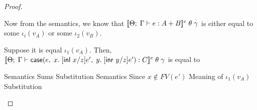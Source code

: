 \begin{proof}
\begin{itemize}
\begin{eqnproof}
  \end{eqnproof}

Now from the semantics, we know that $[\![{{\Theta};\;{\Gamma} \vdash {e} : {A+B}}]\!]^e\;\theta\;\gamma$ is
either equal to some $\iota_i(v_A)$ or some $\iota_2(v_B)$. 

Suppose it is equal $\iota_1(v_A)$. Then,  $[\![{{\Theta};\;{\Gamma} \vdash {\mbox{\textsf{{case}}}(e,\; {x}.\; [\mbox{\textsf{{inl }}}x/z]e',\; {y}.\; [\mbox{\textsf{{inr }}}y/z]e')} : {C}}]\!]^e\;\theta\;\gamma$ is equal to 
\begin{eqnproof}
        {Semantics}
        {Sums}  
        {Substitution}
        {Semantics}
        {Since $x \not \in FV(e')$}
        {Meaning of $\iota_1(v_A)$}
        {Substitution}
\end{eqnproof}


\end{itemize}
\end{proof}
